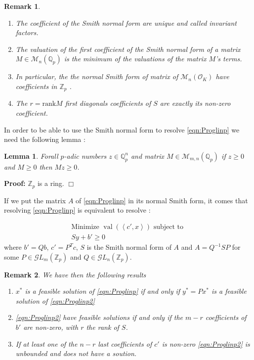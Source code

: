 \documentclass[a4paper,12pt]{article}
\newenvironment{proof}{\hbox{}\vspace{-0.5cm} {\bf Proof:}}{\hfill $\Box$ \\}
\newtheorem{lemma}{Lemma}
\newtheorem{remark}{Remark}
\DeclareMathOperator{\val}{val}
\def\QQ{\ensuremath{\mathbb{Q}}}
\def\ZZ{\ensuremath{\mathbb{Z}}}
\newcommand{\OK}{\mathcal{O}_K}
\begin{document}
\begin{remark}
  \begin{enumerate}%
  \item The coefficient of the Smith normal form are unique and called \textit{invariant factors}.
  \item The valuation of the first coefficient of the Smith normal form of a matrix $M \in \mathcal{M}_n \left( \QQ_p \right) $ is the minimum of the valuations of the matrix $M$'s terms.
  \item In particular, the the normal Smith form of matrix of $\mathcal{M}_n \left( \OK \right) $ have coefficients in $\ZZ_p$ .
  \item The $r = \text{rank} M$ first diagonals coefficients of $S$ are exactly its non-zero coefficient.
  \end{enumerate}
\end{remark}

In order to be able to use the Smith normal form to resolve \ref{eqn:Proglinp} we need the following lemma :

\begin{lemma}
	Forall $p$-adic numbers $z \in \QQ_p ^n$ and matrix $M \in \mathcal{M}_{m,n}\left( \QQ_p  \right)  $ if $z\ge 0$ and $M\ge 0$ then $Mz\ge 0$.  
\end{lemma}
\begin{proof}
	$\ZZ_p$ is a ring.
\end{proof}


If we put the matrix $A$ of \ref{eqn:Proglinp} in its normal Smith form, it comes that resolving \ref{eqn:Proglinp} is equivalent to resolve :    


\begin{equation}
	\tag{PLp'}
	\begin{matrix}
		\text{Minimize } \val\left(\left<c',x \right>\right) \text{ subject to }\\
		Sy + b' \ge 0
	\end{matrix}
	\label{eqn:Proglinp2}
\end{equation}
where $b' = Qb$, $c' = P^Tc$, $S$ is the Smith normal form of $A$ and $A = Q^{-1} S P$ for some $P \in \mathcal{G}L_m\left( \ZZ_p \right)$ and $ Q \in \mathcal{G}L_n\left( \ZZ_p \right)$.

\begin{remark}
	
	We have then the following results
	\begin{enumerate}
		\item $x^*$ is a feasible solution of \ref{eqn:Proglinp} if and only if $y^* = P x^*$ is a feasible solution of \ref{eqn:Proglinp2}
		\item \ref{eqn:Proglinp2} have feasible solutions if and only if the $m-r$ coefficients of $b'$ are non-zero, with $r$ the rank of $S$.
		\item If at least one of the $n-r$ last coefficients of $c'$ is non-zero \ref{eqn:Proglinp2} is unbounded and does not have a soution.
	\end{enumerate}
	
\end{remark}
\end{document}
